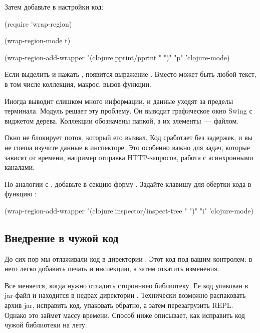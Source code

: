 Затем добавьте в настройки код:

\begin{english}
  \begin{clojure}
(require 'wrap-region)

(wrap-region-mode t)

(wrap-region-add-wrapper
  "(clojure.pprint/pprint "
  ")"
  "p"
  'clojure-mode)
  \end{clojure}
\end{english}

Если выделить  и нажать , появится выражение . Вместо  может быть любой текст, в том числе коллекция, макрос, вызов функции.

Иногда  выводит слишком много информации, и данные уходят за пределы терминала. Модуль  решает эту проблему. Он выводит графическое окно Swing с виджетом дерева. Коллекции обозначены папкой, а их элементы~--- файлом.

Окно не блокирует поток, который его вызвал. Код сработает без задержек, и вы не спеша изучите данные в инспекторе. Это особенно важно для задач, которые зависят от времени, например отправка HTTP-запросов, работа с асинхронными каналами.

По аналогии с , добавьте в секцию  форму . Задайте клавишу для обертки кода в функцию :

\begin{english}
  \begin{clojure}
(wrap-region-add-wrapper
  "(clojure.inspector/inspect-tree "
  ")"
  "i"
  'clojure-mode)
  \end{clojure}
\end{english}

\subsection{Внедрение в чужой код}

До сих пор мы отлаживали код в директории . Этот код под вашим контролем: в него легко добавить печать и инспекцию, а затем откатить изменения.

Все меняется, когда нужно отладить стороннюю библиотеку. Ее код упакован в jar-файл и находится в недрах директории . Технически возможно распаковать архив jar, исправить код, упаковать обратно, а затем перезагрузить REPL. Однако это займет массу времени. Способ ниже описывает, как исправить код чужой библиотеки на лету.

